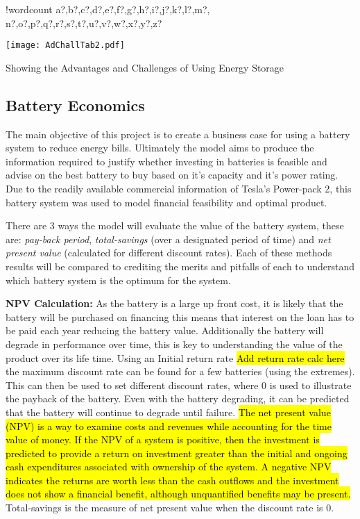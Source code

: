 \documentclass[fontsize=9.5pt]{extarticle}
\numberwithin{figure}{section} %
\newcounter{words}
\newenvironment{counted}{%
  \setcounter{words}{0}
  \SearchList!{wordcount}{\stepcounter{words}}
    {a?,b?,c?,d?,e?,f?,g?,h?,i?,j?,k?,l?,m?,
    n?,o?,p?,q?,r?,s?,t?,u?,v?,w?,x?,y?,z?}
  \UndoBoundary{'}
  \SearchOrder{p;}}{%
  \StopSearching}
\begin{document}
\begin{counted}
\begin{table}[H]
\centering
\texttt{[image: AdChallTab2.pdf]}
\caption{Showing the Advantages and Challenges of Using Energy Storage}
\label{AdChalltab}
\end{table}

\subsection{Battery Economics}\label{battery-economics}

The main objective of this project is to create a business case for
using a battery system to reduce energy bills. Ultimately the model aims
to produce the information required to justify whether investing in
batteries is feasible and advise on the best battery to buy based on
it's capacity and it's power rating. Due to the readily available
commercial information of Tesla's Power-pack 2, this battery system was
used to model financial feasibility and optimal product.

There are 3 ways the model will evaluate the value of the battery
system, these are: \emph{pay-back period}, \emph{total-savings} (over a
designated period of time) and \emph{net present value} (calculated for
different discount rates). Each of these methods results will be
compared to crediting the merits and pitfalls of each to understand
which battery system is the optimum for the system.

\textbf{NPV Calculation:} As the battery is a large up front cost, it is
likely that the battery will be purchased on financing this means that
interest on the loan has to be paid each year reducing the battery
value. Additionally the battery will degrade in performance over time,
this is key to understanding the value of the product over its life
time. Using an Initial return rate \hl{Add return rate calc here} the
maximum discount rate can be found for a few batteries (using the
extremes). This can then be used to set different discount rates, where
0 is used to illustrate the payback of the battery. Even with the
battery degrading, it can be predicted that the battery will continue to
degrade until failure.
\hl{The net present value (NPV) is a way to examine costs and revenues while accounting for the time value of money. If the NPV of a system is positive, then the investment is predicted to provide a return on investment greater than the initial and ongoing cash expenditures associated with ownership of the system. A negative NPV indicates the returns are worth less than the cash outflows and the investment does not show a financial benefit, although unquantified benefits may be present.}
\cite{diorio2015economic} Total-savings is the measure of net present
value when the discount rate is 0.


\end{counted}
\end{document}
